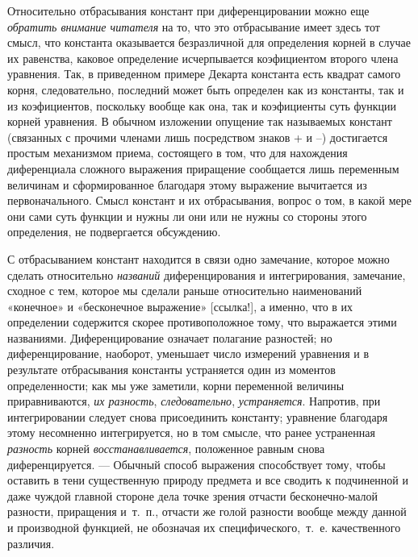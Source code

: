 {Относительно отбрасывания констант при диференцировании можно еще
{\em обратить внимание читателя} на то, что это
отбрасывание имеет здесь тот смысл, что константа оказывается безразличной
для определения корней в случае их равенства, каковое определение
исчерпывается коэфициентом второго члена уравнения. Так, в приведенном
примере Декарта константа есть квадрат самого корня, следовательно,
последний может быть определен как из константы, так и из коэфициентов,
поскольку вообще как она, так и коэфициенты суть функции корней уравнения.
В обычном изложении опущение так называемых констант (связанных с прочими
членами лишь посредством знаков + и –) достигается простым механизмом
приема, состоящего в том, что для нахождения диференциала сложного
выражения приращение сообщается лишь переменным величинам и сформированное
благодаря этому выражение вычитается из первоначального. Смысл констант и
их отбрасывания, вопрос о том, в какой мере они сами суть функции и нужны
ли они или не нужны со стороны этого определения, не подвергается
обсуждению.

С отбрасыванием констант находится в связи одно замечание, которое можно
сделать относительно {\em названий} диференцирования и
интегрирования, замечание, сходное с тем, которое мы сделали раньше
относительно наименований «конечное» и «бесконечное
выражение» [ссылка!], а именно, что в их
определении содержится скорее противоположное тому, что выражается этими
названиями. Диференцирование означает полагание разностей; но
диференцирование, наоборот, уменьшает число измерений уравнения и в
результате отбрасывания константы устраняется один из моментов
определенности; как мы уже заметили, корни переменной величины
приравниваются, {\em их разность},
{\em следовательно},
{\em устраняется}. Напротив, при интегрировании следует
снова присоединить константу; уравнение благодаря этому несомненно
интегрируется, но в том смысле, что ранее устраненная
{\em разность} корней
{\em восстанавливается}, положенное равным снова
диференцируется. — Обычный способ выражения способствует тому, чтобы
оставить в тени существенную природу предмета и все сводить к подчиненной и
даже чуждой главной стороне дела точке зрения отчасти бесконечно-малой
разности, приращения и~т.~п., отчасти же голой разности вообще между данной
и производной функцией, не обозначая их специфического,~т.~е. качественного
различия.

}
